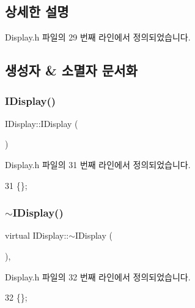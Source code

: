 \subsection{상세한 설명}


Display.\+h 파일의 29 번째 라인에서 정의되었습니다.



\subsection{생성자 \& 소멸자 문서화}
\mbox{\label{class_i_display_a97aa6c259f01df9a808ba12381bb496e}} 
\subsubsection{\texorpdfstring{I\+Display()}{IDisplay()}}
{\footnotesize\ttfamily I\+Display\+::\+I\+Display (\begin{DoxyParamCaption}{ }\end{DoxyParamCaption})\hspace{0.3cm}{\ttfamily [inline]}}



Display.\+h 파일의 31 번째 라인에서 정의되었습니다.


\begin{DoxyCode}
31 \{\};
\end{DoxyCode}
\mbox{\label{class_i_display_a1565628adf40731374c6ea2c76afb1fb}} 
\subsubsection{\texorpdfstring{$\sim$\+I\+Display()}{~IDisplay()}}
{\footnotesize\ttfamily virtual I\+Display\+::$\sim$\+I\+Display (\begin{DoxyParamCaption}{ }\end{DoxyParamCaption})\hspace{0.3cm}{\ttfamily [inline]}, {\ttfamily [virtual]}}



Display.\+h 파일의 32 번째 라인에서 정의되었습니다.


\begin{DoxyCode}
32 \{\};
\end{DoxyCode}


